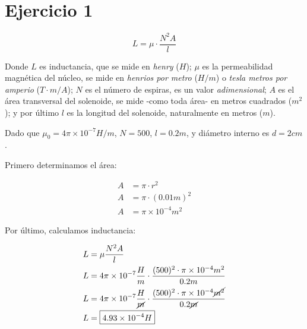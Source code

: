 \section{Ejercicio 1}

\begin{equation*}
    L = \mu \cdot \frac{N^{2}A}{l}
\end{equation*}

Donde \(L\) es inductancia,
que se mide en \textit{henry} (\(H\));
\(\mu\) es la permeabilidad magnética del núcleo,
se mide en \textit{henrios por metro} (\(H/m\)) 
o \textit{tesla metros por amperio} (\(T\cdot m/A\));
\(N\) es el número de espiras,
es un valor \textit{adimensional};
\(A\) es el área transversal del solenoide,
se mide -como toda área- en metros cuadrados (\(m^{2}\));
y por último \(l\) es la longitud del solenoide,
naturalmente en metros (\(m\)).

Dado que \(\mu_0 = 4\pi\times10^{-7} H/m\), \(N = 500\), \(l = 0.2 m\),
y diámetro interno es \(d = 2cm\).

Primero determinamos el área:

\begin{align*}
    A & = \pi\cdot r^{2} \\
    A & = \pi\cdot (0.01 m)^{2} \\
    A & = \boxed{\pi \times 10^{-4} m^{2}}
\end{align*}

Por último, calculamos inductancia:

\begin{align*}
    L & = \mu \frac{N^{2}A}{l} \\
    L & = 4\pi\times10^{-7} \frac{H}{m} \cdot \frac{(500)^{2} \cdot \pi \times 10^{-4} m^{2}}{0.2 m} \\
    L & = 4\pi\times10^{-7} \frac{H}{\cancel{m}} \cdot \frac{(500)^{2} \cdot \pi \times 10^{-4} \cancel{m^{2}}}{0.2 \cancel{m}} \\
    L & = \boxed{4.93\times10^{-4} H}
\end{align*}